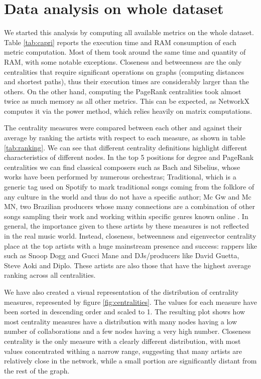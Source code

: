 \section{Data analysis on whole dataset}

We started this analysis by computing all available metrics on the whole dataset. Table \ref{tab:capri} reports the execution time and RAM consumption of each metric computation. Most of them took around the same time and quantity of RAM, with some notable exceptions. Closeness and betweenness are the only centralities that require significant operations on graphs (computing distances and shortest paths), thus their execution times are considerably larger than the others. On the other hand, computing the PageRank centralities took almost twice as much memory as all other metrics. This can be expected, as NetworkX computes it via the power method, which relies heavily on matrix computations.

The centrality measures were compared between each other and against their average by ranking the artists with respect to each measure, as shown in table \ref{tab:ranking}. We can see that different centrality definitions highlight different characteristics of different nodes. In the top 5 positions for degree and PageRank centralities we can find classical composers such as Bach and Sibelius, whose works have been performed by numerous orchestras; Traditional, which is a generic tag used on Spotify to mark traditional songs coming from the folklore of any culture in the world and thus do not have a specific author; Mc Gw and Mc MN, two Brazilian producers whose many connections are a combination of other songs sampling their work and working within specific genres known online \cite{brazilianArtists}. In general, the importance given to these artists by these measures is not reflected in the real music world. Instead, closeness, betweenness and eigenvector centrality place at the top artists with a huge mainstream presence and success: rappers like such as Snoop Dogg and Gucci Mane and DJs/producers like David Guetta, Steve Aoki and Diplo. These artists are also those that have the highest average ranking across all centralities.

We have also created a visual representation of the distribution of centrality measures, represented by figure \ref{fig:centralities}. The values for each measure have been sorted in descending order and scaled to 1. The resulting plot shows how most centrality measures have a distribution with many nodes having a low number of collaborations and a few nodes having a very high number. Closeness centrality is the only measure with a clearly different distribution, with most values concentrated withing a narrow range, suggesting that many artists are relatively close in the network, while a small portion are significantly distant from the rest of the graph.

